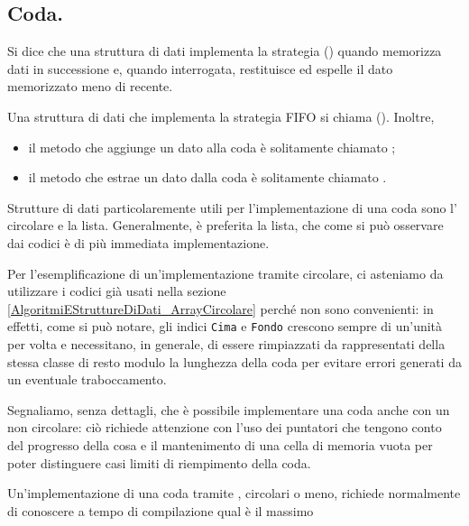 \subsection{Coda.}
\label{AlgoritmiEStruttureDiDati_Coda}
\begin{Definition}
	Si dice che una struttura di dati implementa la strategia 
  () quando memorizza dati in successione e, quando
  interrogata, restituisce ed espelle il dato memorizzato meno di recente.
\end{Definition}
\begin{Definition}
  Una struttura di dati che implementa la strategia FIFO si chiama 
  (). Inoltre,
  \begin{itemize}
    \item il metodo che aggiunge un dato alla coda \`e solitamente chiamato
      ;
    \item il metodo che estrae un dato dalla coda \`e solitamente chiamato
      .
  \end{itemize}
\end{Definition}
\par Strutture di dati particolaremente utili per l'implementazione di una coda
sono l' circolare e la lista. Generalmente, \`e preferita la
lista, che come si pu\`o osservare dai codici \`e di pi\`u immediata
implementazione.
\par Per l'esemplificazione di un'implementazione
tramite  circolare, ci asteniamo da utilizzare i codici gi\`a
usati nella sezione \ref{AlgoritmiEStruttureDiDati_ArrayCircolare} perch\'e non
sono convenienti: in effetti, come si pu\`o notare, gli indici
\texttt{Cima} e
\texttt{Fondo} crescono sempre di un'unit\`a per volta e necessitano,
in generale, di essere rimpiazzati da rappresentati della stessa classe di resto
modulo la lunghezza della coda per evitare errori generati da un eventuale
traboccamento.
\par Segnaliamo, senza dettagli, che \`e possibile implementare una coda anche
con un  non circolare: ci\`o richiede attenzione con l'uso dei
puntatori che tengono conto del progresso della cosa e il mantenimento di una
cella di memoria vuota per poter distinguere casi limiti di riempimento della
coda.
\par Un'implementazione di una coda tramite , circolari o meno,
richiede normalmente di conoscere a tempo di compilazione qual \`e il massimo
